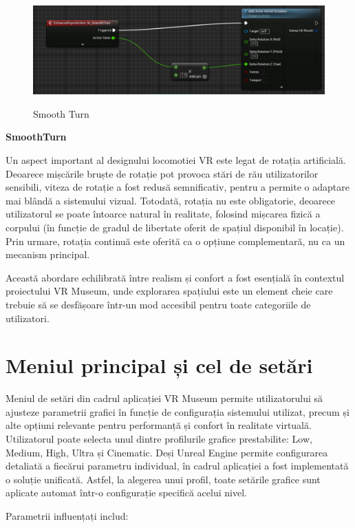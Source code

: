 \begin{figure} [htp] 
\centering 
\includegraphics [width=12cm]
{continut/capitol3/figuri/SmoothTurn.png} 
\label{fig:Smooth_Turn} 
    \caption{Smooth Turn}
\end{figure}

\textbf{SmoothTurn}

Un aspect important al designului locomotiei VR este legat de rotația artificială. Deoarece mișcările bruște de rotație pot provoca stări de rău utilizatorilor sensibili, viteza de rotație a fost redusă semnificativ, pentru a permite o adaptare mai blândă a sistemului vizual. Totodată, rotația nu este obligatorie, deoarece utilizatorul se poate întoarce natural în realitate, folosind mișcarea fizică a corpului (în funcție de gradul de libertate oferit de spațiul disponibil în locație). Prin urmare, rotația continuă este oferită ca o opțiune complementară, nu ca un mecanism principal.

Această abordare echilibrată între realism și confort a fost esențială în contextul proiectului VR Museum, unde explorarea spațiului este un element cheie care trebuie să se desfășoare într-un mod accesibil pentru toate categoriile de utilizatori.


\section{Meniul principal și cel de setări}

Meniul de setări din cadrul aplicației VR Museum permite utilizatorului să ajusteze parametrii grafici în funcție de configurația sistemului utilizat, precum și alte opțiuni relevante pentru performanță și confort în realitate virtuală.
Utilizatorul poate selecta unul dintre profilurile grafice prestabilite: Low, Medium, High, Ultra și Cinematic. Deși Unreal Engine permite configurarea detaliată a fiecărui parametru individual, în cadrul aplicației a fost implementată o soluție unificată. Astfel, la alegerea unui profil, toate setările grafice sunt aplicate automat într-o configurație specifică acelui nivel.

Parametrii influențați includ:

